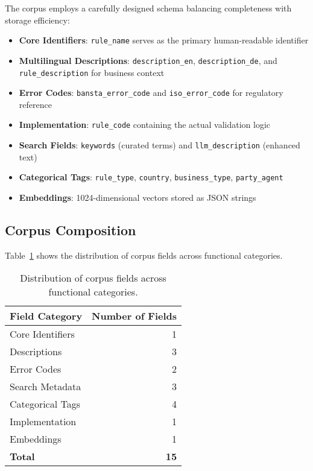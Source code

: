 The corpus employs a carefully designed schema balancing completeness with storage efficiency:

\begin{itemize}[leftmargin=*,itemsep=2pt,topsep=2pt]
 \item \textbf{Core Identifiers}: \texttt{rule\_name} serves as the primary human-readable identifier
 \item \textbf{Multilingual Descriptions}: \texttt{description\_en}, \texttt{description\_de}, and \texttt{rule\_description} for business context
 \item \textbf{Error Codes}: \texttt{bansta\_error\_code} and \texttt{iso\_error\_code} for regulatory reference
 \item \textbf{Implementation}: \texttt{rule\_code} containing the actual validation logic
 \item \textbf{Search Fields}: \texttt{keywords} (curated terms) and \texttt{llm\_description} (enhanced text)
 \item \textbf{Categorical Tags}: \texttt{rule\_type}, \texttt{country}, \texttt{business\_type}, \texttt{party\_agent}
 \item \textbf{Embeddings}: 1024-dimensional vectors stored as JSON strings
\end{itemize}

\subsection{Corpus Composition}

Table~\ref{tab:corpus-composition} shows the distribution of corpus fields across functional categories.

\begin{table}[H]
\centering
\begin{tabular}{lr}
\toprule
\textbf{Field Category} & \textbf{Number of Fields} \\
\midrule
Core Identifiers & 1 \\
Descriptions & 3 \\
Error Codes & 2 \\
Search Metadata & 3 \\
Categorical Tags & 4 \\
Implementation & 1 \\
Embeddings & 1 \\
\midrule
\textbf{Total} & \textbf{15} \\
\bottomrule
\end{tabular}
\caption{Distribution of corpus fields across functional categories.}
\label{tab:corpus-composition}
\end{table}

